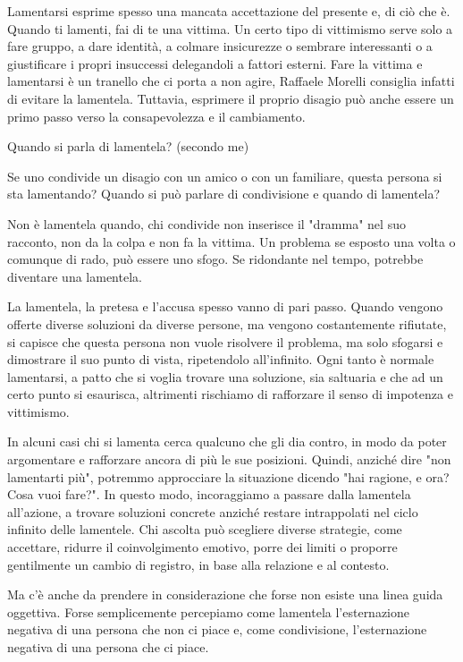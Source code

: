 \documentclass[12pt]{book} %
\begin{document}
Lamentarsi esprime spesso una mancata accettazione del presente e, di ciò che è. Quando ti lamenti, fai di te una vittima. Un certo tipo di
vittimismo serve solo a fare gruppo, a dare identità, a colmare insicurezze o sembrare interessanti o a giustificare i
propri insuccessi delegandoli a fattori esterni. Fare la vittima e lamentarsi è un tranello che ci porta a non agire, Raffaele Morelli consiglia infatti di evitare la lamentela. Tuttavia, esprimere il proprio disagio può anche essere un primo passo verso la consapevolezza e il cambiamento.

\begin{mdframed}[linewidth=1pt]
Quando si parla di lamentela? (secondo me)

Se uno condivide un disagio con un amico o con un familiare, questa persona si sta lamentando? Quando si può parlare di
condivisione e quando di lamentela?

Non è lamentela quando, chi condivide non inserisce il "dramma" nel suo racconto, non da la colpa e non fa la vittima. 
Un problema se esposto una volta o comunque di rado, può essere uno sfogo. Se ridondante nel tempo, potrebbe diventare una lamentela.

La lamentela, la pretesa e l'accusa spesso vanno di pari passo. Quando vengono offerte diverse soluzioni da diverse
persone, ma vengono costantemente rifiutate, si capisce che questa persona non vuole risolvere il problema, ma solo
sfogarsi e dimostrare il suo punto di vista, ripetendolo all'infinito. Ogni tanto è normale lamentarsi, a patto che si voglia trovare una soluzione, sia saltuaria e che ad un certo punto si esaurisca, altrimenti rischiamo di rafforzare il senso di impotenza e vittimismo.

In alcuni casi chi si lamenta cerca qualcuno che gli dia contro, in modo da poter argomentare e rafforzare ancora di più le sue
posizioni. Quindi, anziché dire "non lamentarti più", potremmo approcciare la situazione
dicendo "hai ragione, e ora? Cosa vuoi fare?". In questo modo, incoraggiamo a passare dalla
lamentela all'azione, a trovare soluzioni concrete anziché restare intrappolati nel ciclo infinito delle lamentele. 
Chi ascolta può scegliere diverse strategie, come accettare, ridurre il coinvolgimento emotivo, porre dei limiti o proporre gentilmente un cambio di registro, in base alla relazione e al contesto.

Ma c'è anche da prendere in considerazione che forse non esiste una linea guida oggettiva. Forse
semplicemente percepiamo come lamentela l'esternazione negativa di una persona che non ci piace e, come condivisione,
l'esternazione negativa di una persona che ci piace.


\end{mdframed}
\end{document}
